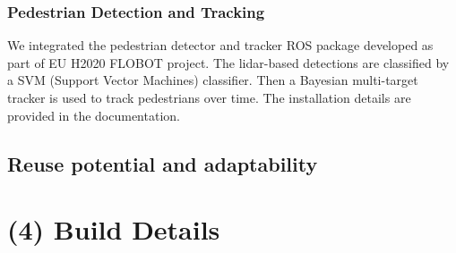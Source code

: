 \documentclass[a4paper]{article}
\begin{document}






\subsubsection{Pedestrian Detection and Tracking}

We integrated the pedestrian detector and tracker ROS package developed as part of EU H2020 FLOBOT project. The lidar-based detections are classified by a SVM (Support Vector Machines) classifier. Then a Bayesian multi-target tracker is used to track pedestrians over time. The installation details are provided in the documentation.  


\subsection{Reuse potential and adaptability}\label{h.6wkumyl0ejrh}





\section{(4) Build Details}\label{h.l8i9vokvs0bj}
\end{document}
